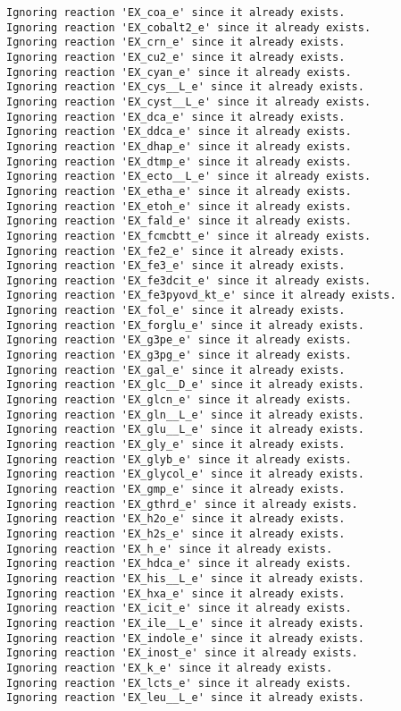 \documentclass[
  letterpaper,
  DIV=11,
  numbers=noendperiod]{scrartcl}
\begin{document}
\begin{verbatim}
Ignoring reaction 'EX_coa_e' since it already exists.
Ignoring reaction 'EX_cobalt2_e' since it already exists.
Ignoring reaction 'EX_crn_e' since it already exists.
Ignoring reaction 'EX_cu2_e' since it already exists.
Ignoring reaction 'EX_cyan_e' since it already exists.
Ignoring reaction 'EX_cys__L_e' since it already exists.
Ignoring reaction 'EX_cyst__L_e' since it already exists.
Ignoring reaction 'EX_dca_e' since it already exists.
Ignoring reaction 'EX_ddca_e' since it already exists.
Ignoring reaction 'EX_dhap_e' since it already exists.
Ignoring reaction 'EX_dtmp_e' since it already exists.
Ignoring reaction 'EX_ecto__L_e' since it already exists.
Ignoring reaction 'EX_etha_e' since it already exists.
Ignoring reaction 'EX_etoh_e' since it already exists.
Ignoring reaction 'EX_fald_e' since it already exists.
Ignoring reaction 'EX_fcmcbtt_e' since it already exists.
Ignoring reaction 'EX_fe2_e' since it already exists.
Ignoring reaction 'EX_fe3_e' since it already exists.
Ignoring reaction 'EX_fe3dcit_e' since it already exists.
Ignoring reaction 'EX_fe3pyovd_kt_e' since it already exists.
Ignoring reaction 'EX_fol_e' since it already exists.
Ignoring reaction 'EX_forglu_e' since it already exists.
Ignoring reaction 'EX_g3pe_e' since it already exists.
Ignoring reaction 'EX_g3pg_e' since it already exists.
Ignoring reaction 'EX_gal_e' since it already exists.
Ignoring reaction 'EX_glc__D_e' since it already exists.
Ignoring reaction 'EX_glcn_e' since it already exists.
Ignoring reaction 'EX_gln__L_e' since it already exists.
Ignoring reaction 'EX_glu__L_e' since it already exists.
Ignoring reaction 'EX_gly_e' since it already exists.
Ignoring reaction 'EX_glyb_e' since it already exists.
Ignoring reaction 'EX_glycol_e' since it already exists.
Ignoring reaction 'EX_gmp_e' since it already exists.
Ignoring reaction 'EX_gthrd_e' since it already exists.
Ignoring reaction 'EX_h2o_e' since it already exists.
Ignoring reaction 'EX_h2s_e' since it already exists.
Ignoring reaction 'EX_h_e' since it already exists.
Ignoring reaction 'EX_hdca_e' since it already exists.
Ignoring reaction 'EX_his__L_e' since it already exists.
Ignoring reaction 'EX_hxa_e' since it already exists.
Ignoring reaction 'EX_icit_e' since it already exists.
Ignoring reaction 'EX_ile__L_e' since it already exists.
Ignoring reaction 'EX_indole_e' since it already exists.
Ignoring reaction 'EX_inost_e' since it already exists.
Ignoring reaction 'EX_k_e' since it already exists.
Ignoring reaction 'EX_lcts_e' since it already exists.
Ignoring reaction 'EX_leu__L_e' since it already exists.

\end{verbatim}
\end{document}
